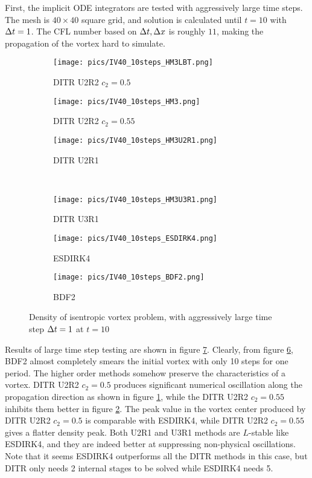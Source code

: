First, the implicit ODE integrators are tested with aggressively large
time steps.
The mesh is $40\times40$ square grid,
and solution is calculated until $t=10$ with $\mathrm\Delta t=1$.
The CFL number based on $\mathrm\Delta t, \mathrm\Delta x$ is roughly $11$,
making the propagation of the vortex hard to
simulate.

\begin{figure}[htbp]
    \centering
    \begin{subfigure}{0.33\textwidth}
        \texttt{[image: pics/IV40\_10steps\_HM3LBT.png]}
        \caption[]{DITR U2R2 $c_2=0.5$}
        \label{sfig:IV10Step_HM3LBT}
    \end{subfigure}\hfill
    \begin{subfigure}{0.33\textwidth}
        \texttt{[image: pics/IV40\_10steps\_HM3.png]}
        \caption[]{DITR U2R2 $c_2=0.55$}
        \label{sfig:IV10Step_HM3}
    \end{subfigure}\hfill
    \begin{subfigure}{0.33\textwidth}
        \texttt{[image: pics/IV40\_10steps\_HM3U2R1.png]}
        \caption[]{DITR U2R1}
        \label{sfig:IV40_10steps_HM3U2R1}
    \end{subfigure}\\
    \begin{subfigure}{0.33\textwidth}
        \texttt{[image: pics/IV40\_10steps\_HM3U3R1.png]}
        \caption[]{DITR U3R1}
        \label{sfig:IV40_10steps_HM3U3R1}
    \end{subfigure}\hfill
    \begin{subfigure}{0.33\textwidth}
        \texttt{[image: pics/IV40\_10steps\_ESDIRK4.png]}
        \caption[]{ESDIRK4}
        \label{sfig:IV10Step_ESDIRK4}
    \end{subfigure}\hfill
    \begin{subfigure}{0.33\textwidth}
        \texttt{[image: pics/IV40\_10steps\_BDF2.png]}
        \caption[]{BDF2}
        \label{sfig:IV10Step_BDF2}
    \end{subfigure}
    \caption{Density of isentropic vortex problem, with aggressively large time step $\mathrm\Delta t = 1$ at $t=10$}
    \label{fig:IV10Step}
\end{figure}

Results of large time step testing are shown in figure \ref{fig:IV10Step}.
Clearly, from figure \ref{sfig:IV10Step_BDF2}, BDF2 almost completely
smears the initial vortex with only 10 steps for one period.
The higher order methods somehow preserve the characteristics of
a vortex. DITR U2R2 $c_2=0.5$ produces significant numerical oscillation along
the propagation direction as shown in figure \ref{sfig:IV10Step_HM3LBT},
while the DITR U2R2 $c_2=0.55$ inhibits them better in figure \ref{sfig:IV10Step_HM3}.
The peak value in the vortex center produced by DITR U2R2 $c_2=0.5$ is comparable with
ESDIRK4, while DITR U2R2 $c_2=0.55$ gives a flatter density peak.
Both U2R1 and U3R1 methods are $L$-stable like ESDIRK4, and they
are indeed better at suppressing non-physical oscillations.
Note that it seems ESDIRK4 outperforms all the DITR methods in
this case, but DITR only needs 2 internal stages to be solved while
ESDIRK4 needs 5.

